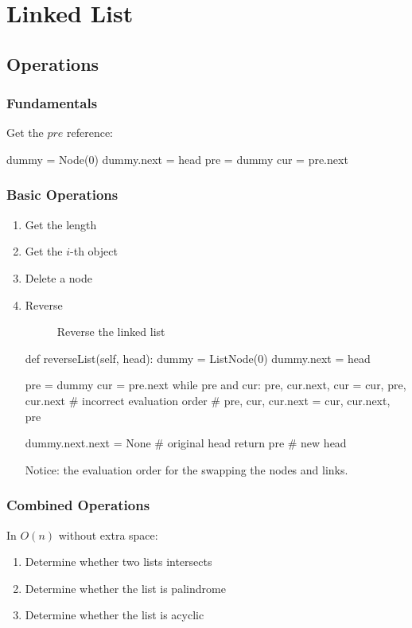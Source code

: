 \chapter{Linked List}


\section{Operations}
\subsection{Fundamentals}
Get the $pre$ reference:
\begin{python}
dummy = Node(0)
dummy.next = head
pre = dummy
cur = pre.next
\end{python}

\subsection{Basic Operations}
\begin{enumerate}
\item Get the length
\item Get the $i$-th object
\item Delete a node 
\item Reverse
\begin{figure}[H]
\centering
{}
\caption{Reverse the linked list}
\label{fig:LABEL}
\end{figure}
\begin{python}
def reverseList(self, head):
    dummy = ListNode(0)
    dummy.next = head

    pre = dummy
    cur = pre.next
    while pre and cur:
        pre, cur.next, cur = cur, pre, cur.next
        # incorrect evaluation order
        # pre, cur, cur.next = cur, cur.next, pre 

    dummy.next.next = None  # original head
    return pre  # new head
\end{python}
Notice: the evaluation order for the swapping the nodes and links. 
\end{enumerate}

\subsection{Combined Operations}
In $O(n)$ without extra space:
\begin{enumerate}
\item Determine whether two lists intersects
\item Determine whether the list is palindrome 
\item Determine whether the list is acyclic
\end{enumerate}
